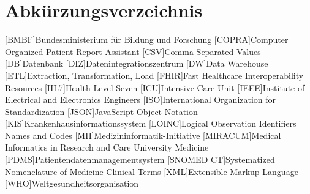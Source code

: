 \chapter*{Abkürzungsverzeichnis}
\setcounter{page}{4}
\begin{acronym}
	
	[BMBF]{Bundesministerium für Bildung und Forschung}
	[COPRA]{Computer Organized Patient Report Assistant}
	[CSV]{Comma-Separated Values}
	[DB]{Datenbank}
	[DIZ]{Datenintegrationszentrum}
	[DW]{Data Warehouse}
	[ETL]{Extraction, Transformation, Load}
	[FHIR]{Fast Healthcare Interoperability Resources}
	[HL7]{Health Level Seven}
	[ICU]{Intensive Care Unit}
	[IEEE]{Institute of Electrical and Electronics Engineers}
	[ISO]{International Organization for Standardization}
	[JSON]{JavaScript Object Notation}
	[KIS]{Krankenhausinformationssystem}
	[LOINC]{Logical Observation Identifiers Names and Codes}
	[MII]{Medizininformatik-Initiative}
	[MIRACUM]{Medical Informatics in Research and Care University Medicine}
	[PDMS]{Patientendatenmanagementsystem}
	[SNOMED CT]{Systematized Nomenclature of Medicine Clinical Terms}
	[XML]{Extensible Markup Language}
	[WHO]{Weltgesundheitsorganisation}

\end{acronym}


